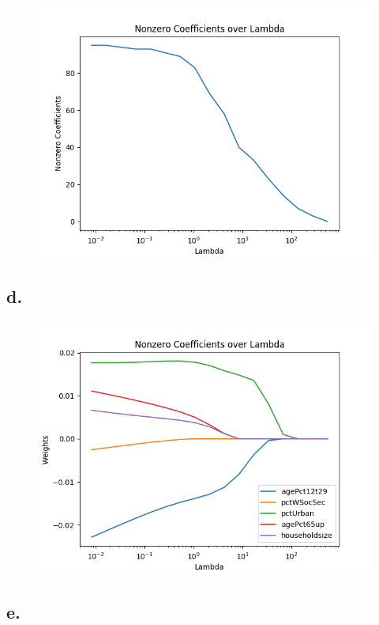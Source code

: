 \documentclass{article}
\newcommand{\1}{\mathbf{1}}
\begin{document}
{\begin{figure}[ht!]
  \centering
  \includegraphics[width=180mm]{../hw2-code/results/a5_c.png}
\end{figure}

\newpage

\subsection*{d.}

\begin{figure}[ht!]
  \centering
  \includegraphics[width=120mm]{../hw2-code/results/a5_d.png}
\end{figure}

\newpage

\subsection*{e.}

}
\end{document}
